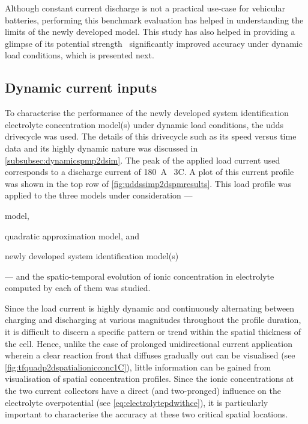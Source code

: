 Although constant  current discharge is  not a practical use-case  for vehicular
batteries, performing this benchmark evaluation  has helped in understanding the
limits of the newly  developed model. This study has also  helped in providing a
glimpse of its  potential strength \viz~significantly  improved accuracy under
dynamic load conditions, which is presented next.

\subsection{Dynamic current inputs}

To characterise  the performance  of the  newly developed  system identification
electrolyte   concentration  model(s)   under  dynamic   load  conditions,   the
\gls{udds}  drivecycle  was  used.  The  details  of  this  drivecycle  such  as
its  speed  versus  time  data  and its  highly  dynamic  nature  was  discussed
in \cref{subsubsec:dynamicspmp2dsim}. The peak of  the applied load current used
corresponds to a discharge current of \SI{180}{\ampere} \ie~3C. A plot of this
current  profile was  shown in  the top  row of \cref{fig:uddssimp2dspmresults}.
This  load  profile  was  applied   to  the  three  models  under  consideration
---
\begin{enumerate*}[label=\itshape\alph*\upshape)] \item {}
model,  \item   quadratic  approximation   model,  and  \item   newly  developed
system identification  model(s) \end{enumerate*} ---
and the spatio-temporal evolution of ionic concentration in electrolyte computed
by each of them was studied.

Since  the  load   current  is  highly  dynamic   and  continuously  alternating
between  charging   and  discharging   at  various  magnitudes   throughout  the
profile   duration,   it   is   difficult  to   discern   a   specific   pattern
or   trend  within   the  spatial   thickness   of  the   cell.  Hence,   unlike
the   case   of  prolonged   unidirectional   current   application  wherein   a
clear   reaction  front   that  diffuses   gradually  out   can  be   visualised
(see \cref{fig:tfquadp2dspatialionicconc1C}), little  information can  be gained
from  visualisation   of  spatial   concentration  profiles.  Since   the  ionic
concentrations at  the two  current collectors have  a direct  (and two-pronged)
influence on the  electrolyte overpotential (see \cref{eq:electrolytepdwithce}),
it is particularly important to characterise  the accuracy at these two critical
spatial locations.

